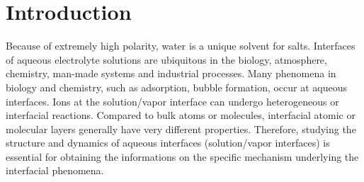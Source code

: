 \chapter{Introduction}\label{CHAPETR_1}
Because of extremely high polarity, water is a unique solvent for salts.
Interfaces of aqueous electrolyte solutions are ubiquitous in the biology, atmosphere, chemistry, man-made systems 
and industrial processes\cite{Irwin88,Tobias99, Benderskii00, 
Asahi01,Benderskii02,Richmond02,LiuH04,
TianCS08,Yamamoto2008, Salmeron2009,ZhangLY09,
LoNostro2012,Piatkowski2014,Balajka2018}.
Many phenomena in biology and chemistry, such as adsorption,
bubble formation, occur at aqueous interfaces\cite{Ball2008,Kuo2004b}. 
Ions at the solution/vapor interface can undergo heterogeneous or interfacial reactions\cite{HuJH95,LiuDF04,Clifford07,Manna13,Pillar2014}.
Compared to bulk atoms or molecules, interfacial atomic or molecular layers generally have very different properties. 
Therefore, studying the structure and dynamics of aqueous interfaces (solution/vapor interfaces) is essential for 
obtaining the informations on the specific mechanism underlying the interfacial phenomena.
 
